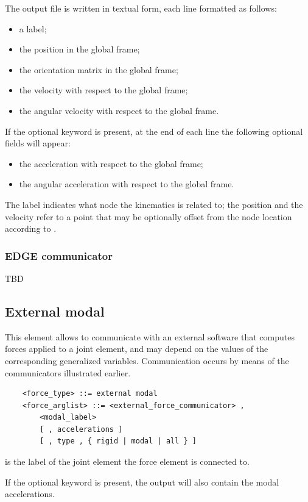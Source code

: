The output file is written in textual form, each line formatted as follows:
\begin{itemize}
\item a label;
\item the position in the global frame;
\item the orientation matrix in the global frame;
\item the velocity with respect to the global frame;
\item the angular velocity with respect to the global frame.
\end{itemize}
If the optional keyword  is present,
at the end of each line the following optional fields will appear:
\begin{itemize}
\item the acceleration with respect to the global frame;
\item the angular acceleration with respect to the global frame.
\end{itemize}
The label indicates what node the kinematics is related to;
the position and the velocity refer to a point that may be optionally
offset from the node location according to .

\subsubsection{EDGE communicator}
TBD


\subsection{External modal}
This element allows to communicate with an external software that computes
forces applied to a 
 joint element,
and may depend on the values of the corresponding generalized variables.
Communication occurs by means of the communicators illustrated earlier.
\begin{verbatim}
    <force_type> ::= external modal
    <force_arglist> ::= <external_force_communicator> ,
        <modal_label>
        [ , accelerations ]
        [ , type , { rigid | modal | all } ]
\end{verbatim}
 is the label of the 
 joint element
the force element is connected to.

If the optional keyword  is present,
the output will also contain the modal accelerations.

